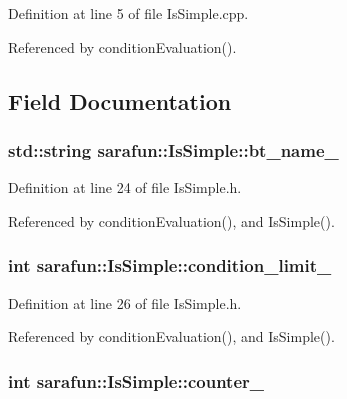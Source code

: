 Definition at line 5 of file Is\-Simple.\-cpp.



Referenced by condition\-Evaluation().



\subsection{Field Documentation}
\hypertarget{classsarafun_1_1IsSimple_a880440b230fe9b00d396905dbe4dfbc6_a880440b230fe9b00d396905dbe4dfbc6}{
\subsubsection[{bt\-\_\-name\-\_\-}]{\setlength{\rightskip}{0pt plus 5cm}std\-::string sarafun\-::\-Is\-Simple\-::bt\-\_\-name\-\_\-\hspace{0.3cm}{\ttfamily [private]}}}\label{classsarafun_1_1IsSimple_a880440b230fe9b00d396905dbe4dfbc6_a880440b230fe9b00d396905dbe4dfbc6}


Definition at line 24 of file Is\-Simple.\-h.



Referenced by condition\-Evaluation(), and Is\-Simple().

\hypertarget{classsarafun_1_1IsSimple_aa02f0e66054f68dccf7cc78c763c7141_aa02f0e66054f68dccf7cc78c763c7141}{
\subsubsection[{condition\-\_\-limit\-\_\-}]{\setlength{\rightskip}{0pt plus 5cm}int sarafun\-::\-Is\-Simple\-::condition\-\_\-limit\-\_\-\hspace{0.3cm}{\ttfamily [private]}}}\label{classsarafun_1_1IsSimple_aa02f0e66054f68dccf7cc78c763c7141_aa02f0e66054f68dccf7cc78c763c7141}


Definition at line 26 of file Is\-Simple.\-h.



Referenced by condition\-Evaluation(), and Is\-Simple().

\hypertarget{classsarafun_1_1IsSimple_a57504174276eda97908a4e48b3625a97_a57504174276eda97908a4e48b3625a97}{
\subsubsection[{counter\-\_\-}]{\setlength{\rightskip}{0pt plus 5cm}int sarafun\-::\-Is\-Simple\-::counter\-\_\-\hspace{0.3cm}{\ttfamily [private]}}}\label{classsarafun_1_1IsSimple_a57504174276eda97908a4e48b3625a97_a57504174276eda97908a4e48b3625a97}



